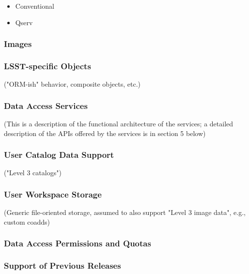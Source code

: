 \begin{itemize}
\item Conventional
\item Qserv
\end{itemize}

\subsubsection{Images}\label{images}

\subsubsection{LSST-specific Objects}\label{lsst-specific-objects}

("ORM-ish" behavior, composite objects, etc.)

\subsubsection{Data Access Services}\label{data-access-services}

(This is a description of the functional architecture of the services; a detailed description of the APIs offered by the services is in section 5 below)

\subsubsection{User Catalog Data Support}\label{user-catalog-data-support}

("Level 3 catalogs")

\subsubsection{User Workspace Storage}\label{user-workspace-storage}

(Generic file-oriented storage, assumed to also support "Level 3 image data", e.g., custom coadds)

\subsubsection{Data Access Permissions and Quotas}\label{data-access-permissions-and-quotas}

\subsubsection{Support of Previous Releases}\label{support-of-previous-releases}

